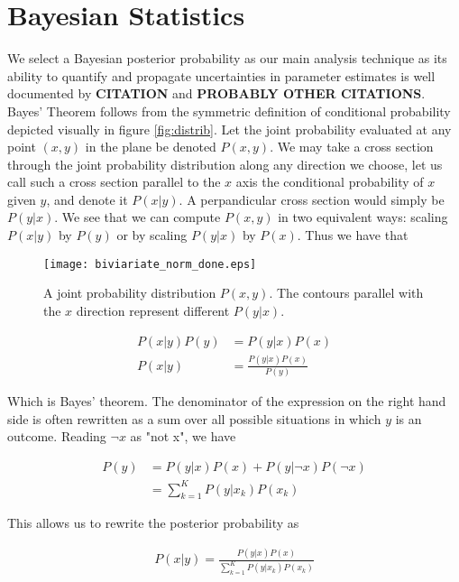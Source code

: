 \documentclass[paper=a4, fontsize=11pt]{scrartcl} %
\numberwithin{equation}{section} %
\numberwithin{figure}{section} %
\numberwithin{table}{section} %
\begin{document}
\section{Bayesian Statistics}
We select a Bayesian posterior probability as our main analysis technique as its ability to quantify and propagate uncertainties in parameter estimates is well documented by \textbf{CITATION} and \textbf{PROBABLY OTHER CITATIONS}. Bayes' Theorem follows from the symmetric definition of conditional probability depicted visually in figure \ref{fig:distrib}. Let the joint probability evaluated at any point $(x,y)$ in the plane be denoted $P(x,y)$. We may take a cross section through the joint probability distribution along any direction we choose, let us call such a cross section parallel to the $x$ axis the conditional probability of $x$ given $y$, and denote it $P(x|y)$. A perpandicular cross section would simply be $P(y|x)$. We see that we can compute $P(x,y)$ in two equivalent ways: scaling $P(x|y)$ by $P(y)$ or by scaling $P(y|x)$ by $P(x)$. Thus we have that 


\begin{figure}[h!]
\center
\texttt{[image: biviariate\_norm\_done.eps]}
\caption{A joint probability distribution $P(x,y)$. The contours parallel with the $x$ direction represent different $P(y|x)$.}
\label{fig:sphere}
\end{figure}

\begin{align} \label{eq:bayes}
P(x|y)P(y) &= P(y|x)P(x) \\
P(x|y) &= \frac{P(y|x)P(x)}{P(y)}
\end{align}

Which is Bayes' theorem. The denominator of the expression on the right hand side is often rewritten as a sum over all possible situations in which $y$ is an outcome. Reading $\neg x$ as "not x", we have

\begin{align}\label{eq:continuous}
P(y) &= P(y|x)P(x) + P(y|\neg x)P(\neg x) \\
&= \sum_{k=1}^K P(y|x_k)P(x_k) 
\end{align}


\clearpage 
This allows us to rewrite the posterior probability as

\begin{align}
P(x|y) = \frac{P(y|x) P(x)}{\sum_{k=1}^K P(y|x_k)P(x_k)}
\end{align}
\end{document}
